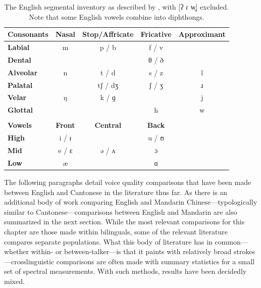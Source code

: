 \begin{table}[htbp]
    \caption{The English segmental inventory as described by \citet{wilson_2011_language}, with [{\ipafont ʔ ɾ w̥}] excluded. Note that some English vowels combine into diphthongs.}
    \label{ch3:tab:englishinventory}
    \centering
    \begin{tabular}{lcccc}
    \toprule
    \textbf{Consonants}  & \textbf{Nasal} & \textbf{Stop/Affricate} & \textbf{Fricative} & \textbf{Approximant} \\
    \midrule
    \textbf{Labial}	 	   &  {\ipafont m} & {\ipafont p / b}   & {\ipafont f / v}  &              \\
    \textbf{Dental}        & 			   & 				    & {\ipafont θ / ð}  &              \\
    \textbf{Alveolar}      &  {\ipafont n} & {\ipafont t / d}   & {\ipafont s / z}  & {\ipafont l} \\
    \textbf{Palatal}       &			   & {\ipafont tʃ / dʒ} & {\ipafont ʃ / ʒ}  & {\ipafont ɹ} \\
    \textbf{Velar}         &  {\ipafont ŋ} & {\ipafont k / ɡ}   &                   & {\ipafont j} \\
    \textbf{Glottal}       &               &                    & {\ipafont h}      & {\ipafont w} \\
                           &               &                    &                   &              \\
    \midrule
    \textbf{Vowels}      & \textbf{Front}     & \textbf{Central}  & \textbf{Back}   &              \\
    \midrule 
    \textbf{High}        & {\ipafont i / ɪ}   &                  & {\ipafont u / ʊ} &              \\
    \textbf{Mid}         & {\ipafont e / ɛ}   & {\ipafont ə / ʌ} & {\ipafont ɔ}     &              \\
    \textbf{Low}         & {\ipafont æ}       & 			     & {\ipafont ɑ}     &              \\
    \bottomrule                
    \end{tabular}
\end{table}

The following paragraphs detail voice quality comparisons that have been made between English and Cantonese in the literature thus far. As there is an additional body of work comparing English and Mandarin Chinese---typologically similar to Cantonese---comparisons between English and Mandarin are also summarized in the next section. While the most relevant comparisons for this chapter are those made within bilinguals, some of the relevant literature compares separate populations. What this body of literature has in common---whether within- or between-talker---is that it paints with relatively broad strokes---crosslinguistic comparisons are often made with summary statistics for a small set of spectral measurements. With such methods, results have been decidedly mixed. 

